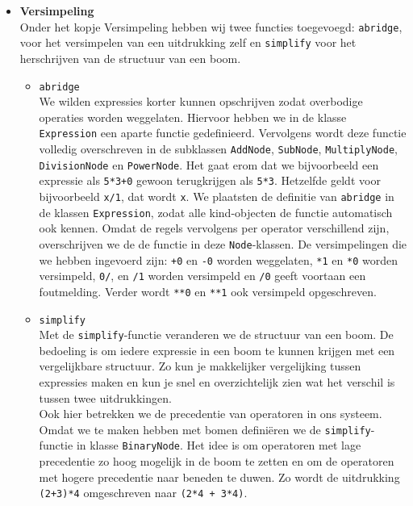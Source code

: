\documentclass[12pt]{article}
\begin{document}
\begin{itemize}
\item \textbf{Versimpeling}\\
Onder het kopje Versimpeling hebben wij twee functies toegevoegd: \texttt{abridge}, voor het versimpelen van een uitdrukking zelf en \texttt{simplify} voor het herschrijven van de structuur van een boom.
\begin{itemize}
\item \texttt{abridge} \\
We wilden expressies korter kunnen opschrijven zodat overbodige operaties worden weggelaten. Hiervoor hebben we in de klasse \texttt{Expression} een aparte functie gedefinieerd. Vervolgens wordt deze functie  volledig overschreven in de  subklassen \texttt{AddNode}, \texttt{SubNode}, \texttt{MultiplyNode}, \texttt{DivisionNode} en \texttt{PowerNode}. Het gaat erom dat we bijvoorbeeld een expressie als \texttt{5*3+0} gewoon terugkrijgen als \texttt{5*3}. Hetzelfde geldt voor bijvoorbeeld \texttt{x/1}, dat wordt \texttt{x}. 
We plaatsten de definitie van \texttt{abridge} in de klassen \texttt{Expression}, zodat alle kind-objecten de functie automatisch ook kennen. Omdat de regels vervolgens per operator verschillend zijn, overschrijven we de de functie in deze \texttt{Node}-klassen. De versimpelingen die we hebben ingevoerd zijn: \texttt{+0} en \texttt{-0} worden weggelaten, \texttt{*1} en \texttt{*0} worden versimpeld, \texttt{0/}, en \texttt{/1} worden versimpeld en \texttt{/0} geeft voortaan een foutmelding. Verder wordt \texttt{**0} en \texttt{**1} ook versimpeld opgeschreven. \\ 
\item \texttt{simplify} \\
Met de \texttt{simplify}-functie veranderen we de structuur van een boom. De bedoeling is om iedere expressie in een boom te kunnen krijgen met een vergelijkbare structuur. Zo kun je makkelijker vergelijking tussen expressies maken en kun je snel en overzichtelijk zien wat het verschil is tussen twee uitdrukkingen. \\ \newline
Ook hier betrekken we de precedentie van operatoren in ons systeem. Omdat we te maken hebben met bomen defini\"eren we de \texttt{simplify}-functie in klasse \texttt{BinaryNode}. Het idee is om operatoren met lage precedentie zo hoog mogelijk in de boom te zetten en om de operatoren met hogere precedentie naar beneden te duwen. Zo wordt  de uitdrukking \texttt{(2+3)*4} omgeschreven naar \texttt{(2*4 + 3*4)}. \\ \newline

\end{itemize}
\end{itemize}
\end{document}
